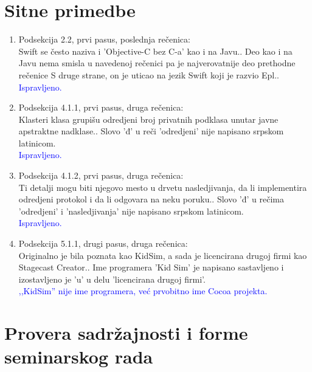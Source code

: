 \documentclass[a4paper]{report}
\newcommand{\odgovor}[1]{\textcolor{blue}{#1}}
\begin{document}
\section{Sitne primedbe}
\begin{enumerate}
	
	\item Podsekcija 2.2, prvi pasus, poslednja rečenica: \\
	\textquotedbl Swift se često naziva i 'Objective-C bez C-a' kao i na Javu.\textquotedbl{}. Deo \textquotedbl kao i na Javu\textquotedbl{} nema smisla u navedenoj rečenici pa je najverovatnije deo prethodne rečenice \textquotedbl S druge
	strane, on je uticao na jezik Swift koji je razvio Epl.\textquotedbl{}. \\
	\odgovor{Ispravljeno.}
	
	\item Podsekcija 4.1.1, prvi pasus, druga rečenica: \\
	\textquotedbl Klasteri klasa grupišu
	odredjeni broj privatnih podklasa unutar javne apstraktne nadklase.\textquotedbl{}. Slovo 'đ' u reči 'odredjeni' nije napisano srpskom latinicom. \\
	\odgovor{Ispravljeno.}
	
	\item Podsekcija 4.1.2, prvi pasus, druga rečenica: \\
	\textquotedbl Ti detalji mogu biti njegovo
	mesto u drvetu nasledjivanja, da li implementira odredjeni protokol i da li odgovara na neku poruku.\textquotedbl{}. Slovo 'đ' u rečima 'odredjeni' i 'nasledjivanja' nije napisano srpskom latinicom. \\
	\odgovor{Ispravljeno.}
	
	\item Podsekcija 5.1.1, drugi pasus, druga rečenica: \\
	\textquotedbl Originalno je bila poznata kao KidSim, a sada je licencirana drugoj firmi kao Stagecast Creator.\textquotedbl{}. Ime programera 'Kid Sim' je napisano sastavljeno i izostavljeno je 'u' u delu 'licencirana drugoj firmi'. \\
	\odgovor{,,KidSim'' nije ime programera, već prvobitno ime Cocoa projekta.}
	
\end{enumerate}

\section{Provera sadržajnosti i forme seminarskog rada}
\end{document}
